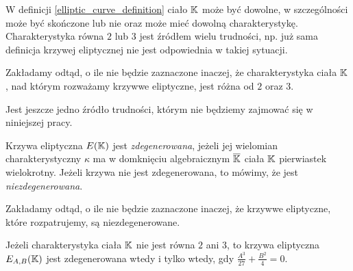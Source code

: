 W definicji \ref{elliptic_curve_definition} ciało $\mathbb{K}$ może być dowolne,
w szczególności może być skończone lub nie
oraz może mieć dowolną charakterystykę.
Charakterystyka równa $2$ lub $3$ jest źródłem wielu trudności,
np. już sama definicja krzywej eliptycznej
nie jest odpowiednia w takiej sytuacji.

\begin{remark}
Zakładamy odtąd, o ile nie będzie zaznaczone inaczej,
że charakterystyka ciała $\mathbb{K}$, nad którym rozważamy krzywwe eliptyczne,
jest różna od $2$ oraz $3$.
\end{remark}

Jest jeszcze jedno źródło trudności,
którym nie będziemy zajmować się w niniejszej pracy.

\begin{definition}
Krzywa eliptyczna $E(\mathbb{K})$ jest \emph{zdegenerowana},
jeżeli jej wielomian charakterystyczny $\kappa$
ma w domknięciu algebraicznym $\overline{\mathbb{K}}$ ciała $\mathbb{K}$
pierwiastek wielokrotny.
Jeżeli krzywa nie jest zdegenerowana,
to mówimy, że jest \emph{niezdegenerowana}.
\end{definition}

\begin{remark}
Zakładamy odtąd, o ile nie będzie zaznaczone inaczej,
że krzywwe eliptyczne, które rozpatrujemy,
są niezdegenerowane.
\end{remark}

\begin{theorem}
Jeżeli charakterystyka ciała $\mathbb{K}$ nie jest równa $2$ ani $3$,
to krzywa eliptyczna $E_{A,B}(\mathbb{K})$ jest zdegenerowana wtedy i tylko wtedy,
gdy $\frac{A^3}{27} + \frac{B^2}{4} = 0$.
\end{theorem}
